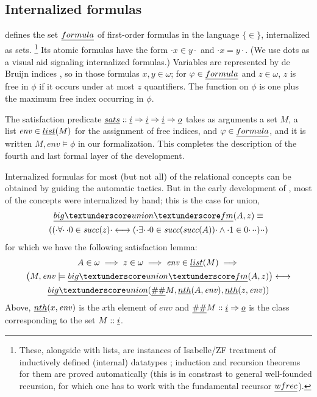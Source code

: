 \subsection{Internalized formulas}
\label{sec:internalized-formulas}

 defines the set $\formula$ of first-order 
formulas in the language $\{ \in \}$, internalized as sets.%
\footnote{These, alongside with lists, are instances of
Isabelle/ZF treatment of inductively defined (internal) datatypes \cite[Sect.~4]{Paulson1995-wz};
induction and recursion theorems for them are proved automatically
(this is in constrast to general well-founded recursion, for which
one has to work with the fundamental recursor $\isa{wfrec}$).}  Its
atomic formulas have the form $\cdot x \in y\cdot$ and $\cdot x =
y\cdot$. (We use dots as a visual aid signaling internalized formulas.)
Variables are represented by de Bruijn indices \cite{MR0321704}, so in
those formulas $x,y \in \omega$; for $\phi\in\formula$ and
$z\in\omega$, $z$ is free in $\phi$ if it occurs under at most $z$
quantifiers. The  function on $\phi$ is one plus the
maximum free index occurring in $\phi$.

The satisfaction predicate
$\isa{sats}::\tyi\fun\tyi\fun\tyi\fun\tyo$ takes as arguments a set
$M$, a list $\mathit{env}\in\isa{list}(M)$ for the assignment of
free indices, and $\phi\in\formula$, and it is written
$M,\mathit{env}\models\phi$ in our formalization.
This completes the
description of the fourth and last formal layer of the development.

Internalized formulas for most (but not all) of the relational
concepts can be obtained by guiding the automatic tactics. But in the
early development of 
, most of the concepts were internalized by
hand; this is the case for union,
\begin{multline*}
  \isa{big{\uscore}union{\uscore}fm}(A,z) \equiv \\
  (({\cdot}\forall{\cdot}\,{\cdot}0 \in \mathit{succ}(z){\cdot} \longleftrightarrow
  ({\cdot}\exists{\cdot}\,{\cdot}0 \in \mathit{succ}(\mathit{succ}(A)){\cdot} \land {\cdot}1 \in
  0{\cdot}\,{\cdot}{\cdot}){\cdot}{\cdot})
\end{multline*}
for which we have the following satisfaction lemma:
\begin{multline}\label{eq:sats_big_union_fm}
  A \in \omega \implies z \in \omega \implies \mathit{env} \in \isa{list}(M)
  \implies \\
  \bigl(M, \mathit{env} \models \isa{big{\uscore}union{\uscore}fm}(A,z)\bigr)%
  \longleftrightarrow \\
  \isa{big{\uscore}union}(\isa{\#\#} M, \isa{nth}(A,
  \mathit{env}), \isa{nth}(z, \mathit{env}))
\end{multline}
Above, $\isa{nth}(x,\mathit{env})$ is the $x$th element of $\mathit{env}$
and $\isa{\#\#}M::\tyi\fun \tyo$ is the class corresponding to the
set $M::\tyi$.

